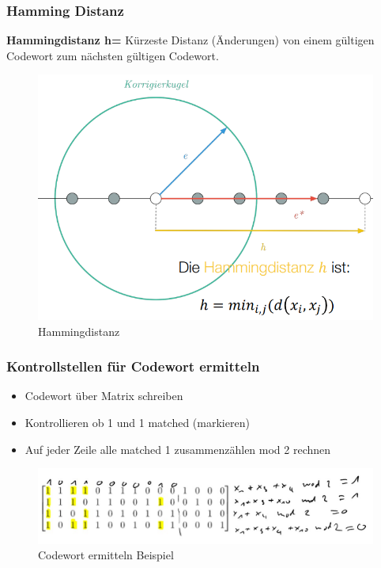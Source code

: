 \subsubsection{Hamming Distanz}
\textbf{Hammingdistanz h=} Kürzeste Distanz (Änderungen) von einem gültigen Codewort zum nächsten gültigen Codewort.
\begin{figure}[h!]
	\centering
	\begin{minipage}[t]{0.6\textwidth}
		\centering
		\includegraphics[width=0.9\linewidth]{images/hammingdistanz}
		\caption{Hammingdistanz}
		\label{fig:hammingdistanz}
	\end{minipage}
\end{figure}

\subsubsection{Kontrollstellen für Codewort ermitteln}
\begin{itemize}
	\item Codewort über Matrix schreiben
	\item Kontrollieren ob 1 und 1 matched (markieren)
	\item Auf jeder Zeile alle matched 1 zusammenzählen mod 2 rechnen
\end{itemize}
\begin{figure}[h!]
	\centering
	\begin{minipage}[t]{0.6\textwidth}
		\centering
		\includegraphics[width=0.9\linewidth]{images/codewort}
		\caption{Codewort ermitteln Beispiel}
		\label{fig:codewortermitteln}
	\end{minipage}
\end{figure}
\clearpage

